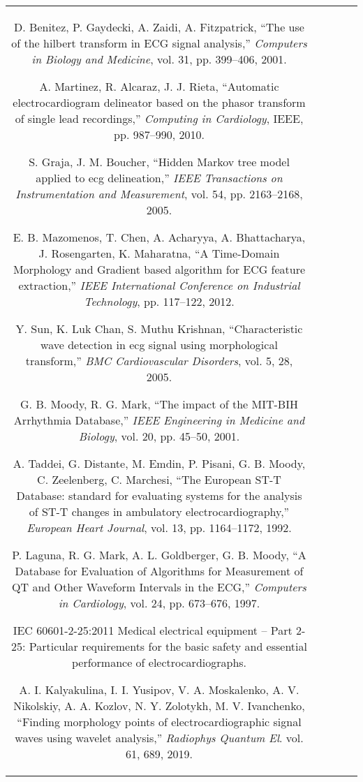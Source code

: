 \documentclass[submitted]{ieeeaccess}
\begin{document}
\begin{table}
\begin{tabular}{|c|c|c|c|c|}
\begin{thebibliography}{99}
	\bibitem{Benitez2001}
	D. Benitez, P. Gaydecki, A. Zaidi, A. Fitzpatrick, 
	``{T}he use of the hilbert transform in ECG signal analysis,''
	\emph{Computers in Biology and Medicine}, vol. 31, pp. 399--406, 2001.
	
	\bibitem{Martinez2010}
	A. Martinez, R. Alcaraz, J. J. Rieta, 
	``{A}utomatic electrocardiogram delineator based on the phasor transform of single lead recordings,''
	\emph{Computing in Cardiology}, IEEE, pp. 987--990, 2010.
	
	\bibitem{Graja2005}
	S. Graja, J. M. Boucher, 
	``{H}idden Markov tree model applied to ecg delineation,''
	\emph{IEEE Transactions on Instrumentation and Measurement},
    vol. 54, pp. 2163--2168, 2005.
	
	\bibitem{Mazomenos2012}
	E. B. Mazomenos, T. Chen, A. Acharyya, A. Bhattacharya, J. Rosengarten, K. Maharatna,
	``{A} Time-Domain Morphology and Gradient based algorithm for ECG feature extraction,''
	\emph{IEEE International Conference on Industrial Technology}, pp. 117--122, 2012.
	
	\bibitem{Sun2005}
	Y. Sun, K. Luk Chan, S. Muthu Krishnan, 
	``{C}haracteristic wave detection in ecg signal using morphological transform,''
	\emph{BMC Cardiovascular Disorders}, vol. 5, 28, 2005.
	
	\bibitem{mitdb}
	G. B. Moody, R. G. Mark, 
	``{T}he impact of the MIT-BIH Arrhythmia Database,''
	\emph{IEEE Engineering in Medicine and Biology}, vol. 20, pp. 45--50, 2001.
	
	\bibitem{edb}
	A. Taddei, G. Distante, M. Emdin, P. Pisani, G. B. Moody, C. Zeelenberg, C. Marchesi, 
	``{T}he European ST-T Database: standard for evaluating systems for the analysis of ST-T changes in ambulatory electrocardiography,'' 
	\emph{European Heart Journal}, vol. 13, pp. 1164--1172, 1992.
	
	\bibitem{qtdb}
	P. Laguna, R. G. Mark, A. L. Goldberger, G. B. Moody, 
	``{A} Database for Evaluation of Algorithms for Measurement of QT and Other Waveform Intervals in the ECG,''
	\emph{Computers in Cardiology}, vol. 24, pp. 673--676, 1997.
	
	\bibitem{IEC} IEC 60601-2-25:2011 
    Medical electrical equipment -- Part 2-25: Particular requirements for the basic safety and essential performance of electrocardiographs.

	\bibitem{Kalyakulina2018} 
    A. I. Kalyakulina, I. I. Yusipov, V. A. Moskalenko, A. V. Nikolskiy, A. A. Kozlov, N. Y. Zolotykh, M. V. Ivanchenko, 
    ``Finding morphology points of electrocardiographic signal waves using wavelet analysis,''
    \emph{Radiophys Quantum El}.
    vol. 61, 689, 2019.


\end{thebibliography}
\end{tabular}
\end{table}
\end{document}
